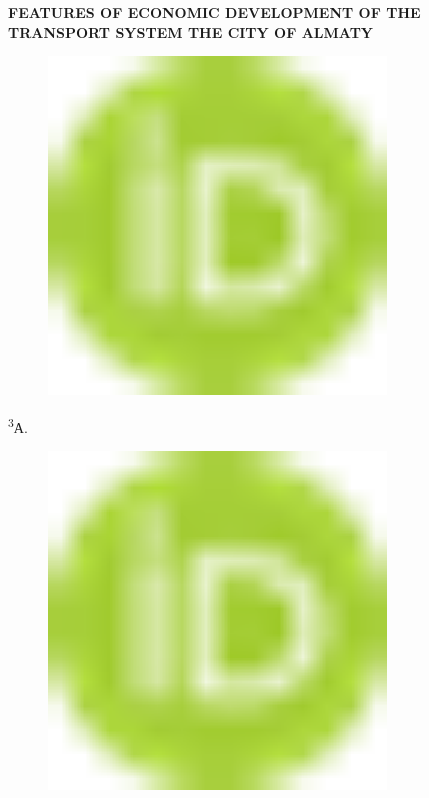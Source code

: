 
{\bfseries FEATURES OF ECONOMIC DEVELOPMENT OF THE TRANSPORT SYSTEM THE
CITY OF ALMATY}

\begin{figure}[H]
	\centering
	\includegraphics[width=0.8\textwidth]{media/ekon2/image1}
	\caption*{}
\end{figure}

\textsuperscript{3}А.
\begin{figure}[H]
	\centering
	\includegraphics[width=0.8\textwidth]{media/ekon2/image1}
	\caption*{}
\end{figure}

